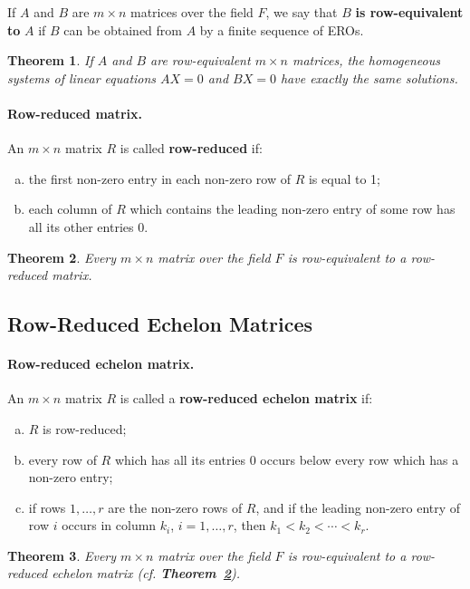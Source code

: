 \documentclass{article}
\newtheorem{theorem}{Theorem}[section]
\begin{document}
If $A$ and $B$ are $m \times n$ matrices over the field $F$, we say that $B$
\textbf{is row-equivalent to} $A$ if $B$ can be obtained from $A$ by a finite
sequence of EROs.

\begin{theorem}
  If $A$ and $B$ are row-equivalent $m \times n$ matrices, the homogeneous
  systems of linear equations $AX = 0$ and $BX = 0$ have exactly the same
  solutions.
\end{theorem}

\paragraph{Row-reduced matrix.} An $m \times n$ matrix $R$ is called
\textbf{row-reduced} if:
\begin{enumerate}[(a)]
  \item the first non-zero entry in each non-zero row of $R$ is equal to 1;
  \item each column of $R$ which contains the leading non-zero entry of some
    row has all its other entries 0.
\end{enumerate}

\begin{theorem} \label{thm:4}
  Every $m \times n$ matrix over the field $F$ is row-equivalent to a
  row-reduced matrix.
\end{theorem}

\subsection{Row-Reduced Echelon Matrices}

\paragraph{Row-reduced echelon matrix.} An $m \times n$ matrix $R$ is called a
\textbf{row-reduced echelon matrix} if:
\begin{enumerate}[(a)]
  \item $R$ is row-reduced;
  \item every row of $R$ which has all its entries 0 occurs below every row
    which has a non-zero entry;
  \item if rows $1, \ldots, r$ are the non-zero rows of $R$, and if the leading
    non-zero entry of row $i$ occurs in column $k_i$, $i = 1, \ldots, r$, then
    $k_1 < k_2 < \cdots < k_r$.
\end{enumerate}

\begin{theorem}
  Every $m \times n$ matrix over the field $F$ is row-equivalent to a
  row-reduced echelon matrix (cf. \textbf{Theorem~\ref{thm:4}}).
\end{theorem}
\end{document}
